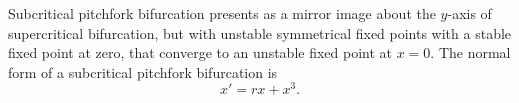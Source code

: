 \documentclass{article}
\begin{document}
\begin{definition}
	Subcritical pitchfork bifurcation presents as a mirror image about the \(y\)-axis of supercritical bifurcation, but with unstable symmetrical fixed points with a stable fixed point at zero, that converge to an unstable fixed point at \(x=0\). The normal form of a subcritical pitchfork bifurcation is
	\begin{equation*}
		x'=rx+x^3.
	\end{equation*}
\end{definition}
\end{document}
